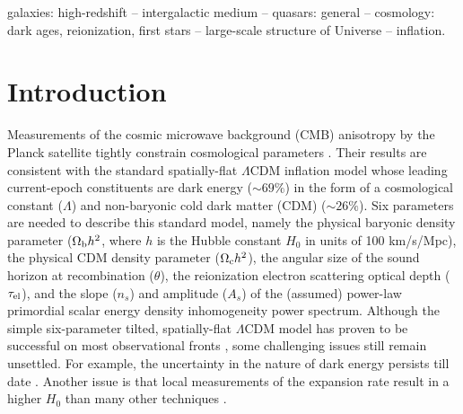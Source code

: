 \documentclass[useAMS,usenatbib]{mnras}
\begin{document}
\begin{keywords}
galaxies: high-redshift -- intergalactic medium -- quasars: general -- cosmology:
dark ages, reionization, first stars -- large-scale structure of Universe -- inflation.
\end{keywords}

\section{Introduction}

Measurements of the cosmic microwave background (CMB) anisotropy by the 
Planck satellite tightly constrain cosmological parameters \citep{2016A&A...594A..13P}. 
Their results are consistent with the standard spatially-flat $\Lambda$CDM 
inflation model \citep{1984ApJ...284..439P} whose leading current-epoch 
constituents are dark energy ($\sim69\%$) in the form of a cosmological 
constant ($\Lambda$) and non-baryonic cold dark matter (CDM) ($\sim26\%$). 
Six parameters are needed to describe this standard model, namely the 
physical baryonic density parameter ($\Omega_{\rm b}h^2$, where $h$ is the 
Hubble constant $H_0$ in units of 100 km/s/Mpc), the physical CDM density 
parameter ($\Omega_{\rm c}h^2$), the angular size of the sound 
horizon at recombination ($\theta$), the reionization electron scattering 
optical depth ($\tau_{\rm el}$), and the slope ($n_s$) and amplitude ($A_s$) of 
the (assumed) power-law primordial scalar energy density inhomogeneity
power spectrum. Although the simple six-parameter tilted, spatially-flat 
$\Lambda$CDM
model has proven to be successful on most observational fronts \citep{2016A&A...594A..13P},
some challenging issues still remain unsettled. For example, 
the uncertainty in the nature of dark energy persists till date
\citep{1988ApJ...325L..17P,1988PhRvD..37.3406R,2000IJMPD...9..373S,2003PhR...380..235P,
2004LNP...653..141S,2007MNRAS.380.1573S,2008PASP..120..235R}. Another issue is that local
measurements of the expansion rate result in a higher $H_0$
\citep[e.g.,][]{2016ApJ...826...56R} than many other techniques
\citep{2011PASP..123.1127C,2012PhRvD..86d3520C,2013JCAP...10..060S,2015PhRvD..92l3516A,
2016A&A...594A..13P,2017JCAP...01..015L,2017ApJ...835...86C,2016A&A...595A.109L,
2017ApJ...849...84W,2017PhRvD..96h3532L,2017arXiv171100403D,2018ApJ...856....3Y}.
\end{document}
